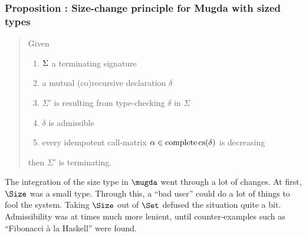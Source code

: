 \subsubsection{Proposition : Size-change principle for Mugda with sized types}
\begin{quote}
Given
\begin{enumerate}
\item
$\Sigma$ a terminating signature
\item
a mutual (co)recursive declaration $\delta$
\item
$\Sigma'$ is resulting from type-checking $\delta$ in $\Sigma$
\item
$\delta$ is admissible
\item
every idempotent call-matrix $ \alpha \in \operatorname{complete} \operatorname{cs}(\delta)$ is decreasing
\end{enumerate}
then $\Sigma'$ is terminating.
\end{quote}
\noindent The integration of the size type in $\mugda$ went through a lot of changes.
At first, $\Size$ was a small type. Through this, a ``bad user'' could do a lot of things
to fool the system. Taking $\Size$ out of $\Set$ defused the situation quite a bit.
Admissibility was at times much more lenient, until counter-examples such as ``Fibonacci \`a la Haskell'' were found.

